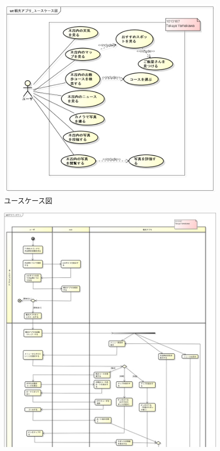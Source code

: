 \documentclass[openany,11pt,papersize]{jsbook}
\begin{document}
\begin{appendix}

    \begin{figure}{}
        \begin{center}
\includegraphics[width=14cm, bb=0 0 520 388]{project_usecase2.png}
        \end{center}
         \caption{ユースケース図}
 \label{fig:one}
      \end{figure}
 

    \begin{figure}{}
        \begin{center}
\includegraphics[width=20cm, bb=0 0 1880 2077]{project_activity2.2-1.png}
        \end{center}
 \label{fig:one}
      \end{figure}
      


\end{appendix}
\end{document}
